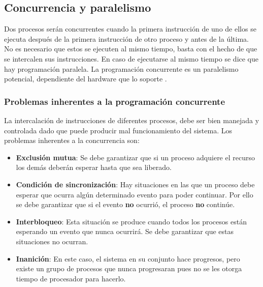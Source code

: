 \subsection{Concurrencia y paralelismo}
Dos procesos serán concurrentes cuando la primera instrucción de uno de ellos se ejecuta después de la primera instrucción de otro proceso y antes de la última.
No es necesario que estos se ejecuten al mismo tiempo, basta con el hecho de que se intercalen sus instrucciones. En caso de ejecutarse al mismo tiempo se dice que hay programación paralela.
La programación concurrente es un paralelismo potencial, dependiente del hardware que lo soporte  \cite{mendez}.

\subsubsection{Problemas inherentes a la programación concurrente}
La intercalación de instrucciones de diferentes procesos, debe ser bien manejada y controlada dado que puede producir mal funcionamiento del sistema. Los problemas inherentes a la concurrencia son:
\begin{itemize}
    \item \textbf{Exclusión mutua}: Se debe garantizar que si un proceso adquiere el recurso los demás deberán esperar hasta que sea liberado.

    \item \textbf{Condición de sincronización}: Hay situaciones en las que un proceso debe esperar que ocurra algún determinado evento para poder continuar. Por ello se debe garantizar que si el evento \textbf{no} ocurrió, el proceso \textbf{no} continúe. 
    
    \item \textbf{Interbloqueo}: Esta situación se produce cuando todos los procesos están esperando un evento que nunca ocurrirá. Se debe garantizar que estas situaciones no ocurran.
    
    \item \textbf{Inanición}: En este caso, el sistema en su conjunto hace progresos, pero existe un grupo de procesos que nunca progresaran pues no se les otorga tiempo de procesador para hacerlo.
\end{itemize}

